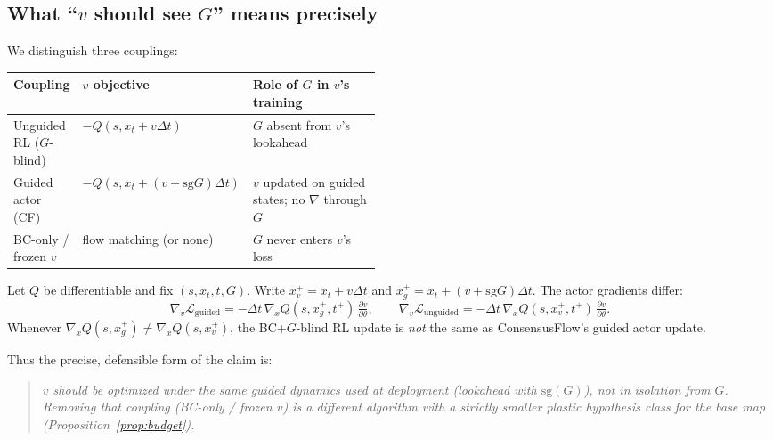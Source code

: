 \subsection{What ``$v$ should see $G$'' means precisely}
\label{subsec:see-g}

We distinguish three couplings:

\begin{center}
\begin{tabular}{@{}llp{0.48\linewidth}@{}}
\toprule
Coupling & $v$ objective & Role of $G$ in $v$'s training \\
\midrule
Unguided RL ($G$-blind) &
  $-Q(s,x_t+v\Delta t)$ &
  $G$ absent from $v$'s lookahead \\
Guided actor (CF) &
  $-Q(s,x_t+(v+\mathrm{sg}G)\Delta t)$ &
  $v$ updated on guided states; no $\nabla$ through $G$ \\
BC-only / frozen $v$ &
  flow matching (or none) &
  $G$ never enters $v$'s loss \\
\bottomrule
\end{tabular}
\end{center}

\begin{proposition}
\label{prop:guided-target}
Let $Q$ be differentiable and fix $(s,x_t,t,G)$.
Write $x_v^+=x_t+v\Delta t$ and $x_g^+=x_t+(v+\mathrm{sg}G)\Delta t$.
The actor gradients differ:
\begin{equation}
  \nabla_v\mathcal{L}_{\mathrm{guided}}
  =-\Delta t\,\nabla_x Q(s,x_g^+,t^+)\,
  \tfrac{\partial v}{\partial\theta},
  \qquad
  \nabla_v\mathcal{L}_{\mathrm{unguided}}
  =-\Delta t\,\nabla_x Q(s,x_v^+,t^+)\,
  \tfrac{\partial v}{\partial\theta}.
\end{equation}
Whenever $\nabla_x Q(s,x_g^+)\neq\nabla_x Q(s,x_v^+)$, the BC+$G$-blind RL
update is \emph{not} the same as ConsensusFlow's guided actor update.
\end{proposition}

\noindent Thus the precise, defensible form of the claim is:

\begin{quote}
\emph{$v$ should be optimized under the same guided dynamics used at deployment
(lookahead with $\mathrm{sg}(G)$), not in isolation from $G$.
Removing that coupling (BC-only / frozen $v$) is a different algorithm with a
strictly smaller plastic hypothesis class for the base map
(Proposition~\ref{prop:budget}).}
\end{quote}

